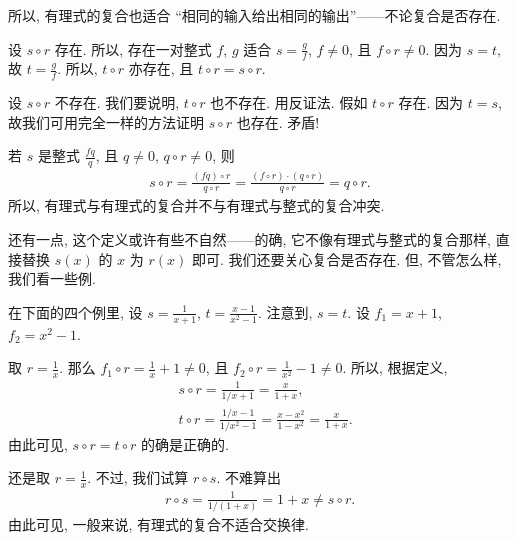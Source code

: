 \begin{remark}
    所以, 有理式的复合也适合 ``相同的输入给出相同的输出''——不论复合是否存在.
\end{remark}

\begin{pf}
    设 $s \circ r$ 存在. 所以, 存在一对整式 $f$, $g$ 适合 $s = \frac{g}{f}$, $f \neq 0$, 且 $f \circ r \neq 0$. 因为 $s = t$, 故 $t = \frac{g}{f}$. 所以, $t \circ r$ 亦存在, 且 $t \circ r = s \circ r$.

    设 $s \circ r$ 不存在. 我们要说明, $t \circ r$ 也不存在. 用反证法. 假如 $t \circ r$ 存在. 因为 $t = s$, 故我们可用完全一样的方法证明 $s \circ r$ 也存在. 矛盾!
\end{pf}

\begin{remark}
    若 $s$ 是整式 $\frac{fq}{q}$, 且 $q \neq 0$, $q \circ r \neq 0$, 则
    \begin{align*}
        s \circ r = \frac{(fq) \circ r}{q \circ r} = \frac{(f \circ r) \cdot (q \circ r)}{q \circ r} = q \circ r.
    \end{align*}
    所以, 有理式与有理式的复合并不与有理式与整式的复合冲突.
\end{remark}


还有一点, 这个定义或许有些不自然——的确, 它不像有理式与整式的复合那样, 直接替换 $s(x)$ 的 $x$ 为 $r(x)$ 即可. 我们还要关心复合是否存在. 但, 不管怎么样, 我们看一些例.

在下面的四个例里, 设 $s = \frac{1}{x+1}$, $t = \frac{x-1}{x^2-1}$. 注意到, $s = t$. 设 $f_1 = x+1$, $f_2 = x^2 - 1$.

\begin{example}
    取 $r = \frac{1}{x}$. 那么 $f_1 \circ r = \frac{1}{x} + 1 \neq 0$, 且 $f_2 \circ r = \frac{1}{x^2} - 1 \neq 0$. 所以, 根据定义,
    \begin{align*}
         & s \circ r = \frac{1}{1/x + 1} = \frac{x}{1 + x},                                   \\
         & t \circ r = \frac{1/x - 1}{1/x^2 - 1} = \frac{x - x^2}{1 - x^2} = \frac{x}{1 + x}.
    \end{align*}
    由此可见, $s \circ r = t \circ r$ 的确是正确的.
\end{example}

\begin{example}
    还是取 $r = \frac{1}{x}$. 不过, 我们试算 $r \circ s$. 不难算出
    \begin{align*}
        r \circ s = \frac{1}{1/(1 + x)} = 1 + x \neq s \circ r.
    \end{align*}
    由此可见, 一般来说, 有理式的复合不适合交换律.
\end{example}

